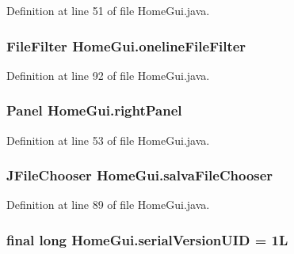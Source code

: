 Definition at line 51 of file Home\-Gui.\-java.

\hypertarget{class_home_gui_a8b0192c597368a34c855abe70a8a80ec}{
\subsubsection[{oneline\-File\-Filter}]{\setlength{\rightskip}{0pt plus 5cm}File\-Filter {\bf Home\-Gui.\-oneline\-File\-Filter}}}\label{class_home_gui_a8b0192c597368a34c855abe70a8a80ec}


Definition at line 92 of file Home\-Gui.\-java.

\hypertarget{class_home_gui_adb0131b6ea64353bf6b0c5993468341c}{
\subsubsection[{right\-Panel}]{\setlength{\rightskip}{0pt plus 5cm}Panel {\bf Home\-Gui.\-right\-Panel}}}\label{class_home_gui_adb0131b6ea64353bf6b0c5993468341c}


Definition at line 53 of file Home\-Gui.\-java.

\hypertarget{class_home_gui_ae91c33454848f18d29839444a30a5bd7}{
\subsubsection[{salva\-File\-Chooser}]{\setlength{\rightskip}{0pt plus 5cm}J\-File\-Chooser {\bf Home\-Gui.\-salva\-File\-Chooser}}}\label{class_home_gui_ae91c33454848f18d29839444a30a5bd7}


Definition at line 89 of file Home\-Gui.\-java.

\hypertarget{class_home_gui_a6a93dac6b8c89a59ca14536d6f5ad414}{
\subsubsection[{serial\-Version\-U\-I\-D}]{\setlength{\rightskip}{0pt plus 5cm}final long {\bf Home\-Gui.\-serial\-Version\-U\-I\-D} = 1\-L}}\label{class_home_gui_a6a93dac6b8c89a59ca14536d6f5ad414}


